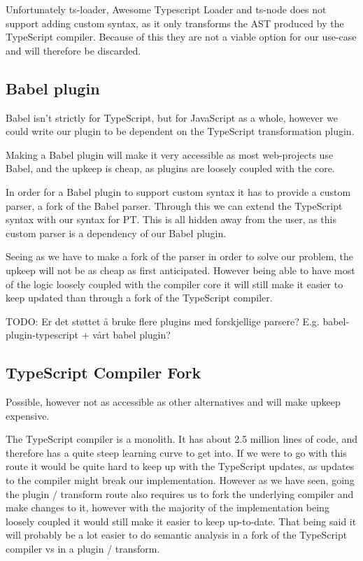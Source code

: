 Unfortunately ts-loader, Awesome Typescript Loader and ts-node does not support adding custom syntax, as it only transforms the AST produced by the TypeScript compiler.
Because of this they are not a viable option for our use-case and will therefore be discarded.

\subsection{Babel plugin}\label{subsec:babel-plugin}

Babel isn't strictly for TypeScript, but for JavaScript as a whole, however we could write our plugin to be dependent on the TypeScript transformation plugin.

Making a Babel plugin will make it very accessible as most web-projects use Babel, and the upkeep is cheap, as plugins are loosely coupled with the core.

In order for a Babel plugin to support custom syntax it has to provide a custom parser, a fork of the Babel parser.
Through this we can extend the TypeScript syntax with our syntax for PT.
This is all hidden away from the user, as this custom parser is a dependency of our Babel plugin.

Seeing as we have to make a fork of the parser in order to solve our problem, the upkeep will not be as cheap as first anticipated.
However being able to have most of the logic loosely coupled with the compiler core it will still make it easier to keep updated than through a fork of the TypeScript compiler.

TODO: Er det støttet å bruke flere plugins med forskjellige parsere?
E.g. babel-plugin-typescript + vårt babel plugin?

\subsection{TypeScript Compiler Fork}\label{subsec:typescript-compiler-fork}

Possible, however not as accessible as other alternatives and will make upkeep expensive.

The TypeScript compiler is a monolith.
It has about 2.5 million lines of code, and therefore has a quite steep learning curve to get into.
If we were to go with this route it would be quite hard to keep up with the TypeScript updates, as updates to the compiler might break our implementation.
However as we have seen, going the plugin / transform route also requires us to fork the underlying compiler and make changes to it, however with the majority of the implementation being loosely coupled it would still make it easier to keep up-to-date.
That being said it will probably be a lot easier to do semantic analysis in a fork of the TypeScript compiler vs in a plugin / transform.
